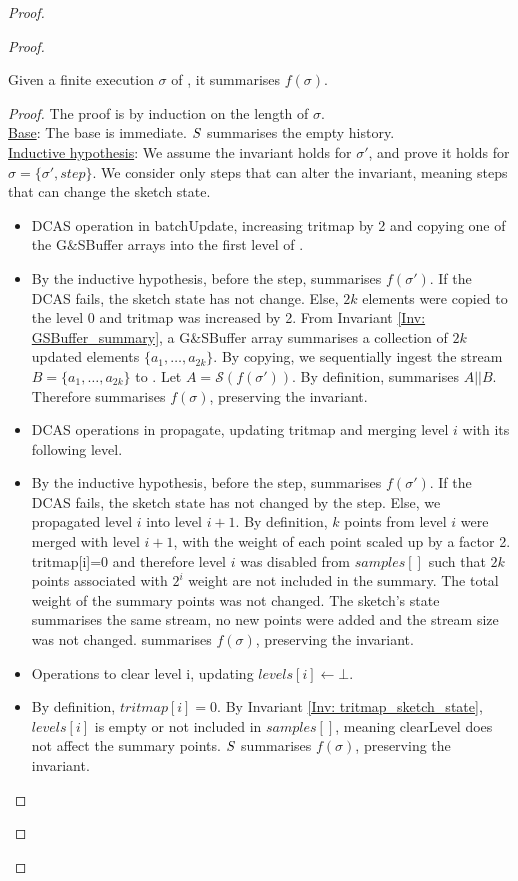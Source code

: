 \begin{proof}
\begin{proof}
\begin{invariant}\label{Inv: summary_history}
Given a finite execution $\sigma$ of \mysketch, it summarises \(f(\sigma)\).
\end{invariant}
\begin{proof}
The proof is by induction on the length of \(\sigma\).\\
\underline{Base}: The base is immediate. \(\mathnormal{S}\) summarises the empty history.\\
\underline{Inductive hypothesis}: We assume the invariant holds for \(\sigma'\), and prove it holds for \(\sigma = \{\sigma',step\}\). We consider only steps that can alter the invariant, meaning steps that can change the sketch state.
\begin{itemize}
    \item DCAS operation in batchUpdate, increasing tritmap by 2 and copying one of the G\&SBuffer arrays into the first level of \mysketch.
    \item[] By the inductive hypothesis, before the step, \mysketch summarises \(f(\sigma')\). If the DCAS fails, the sketch state has not change. Else, $2k$ elements were copied to the level 0 and tritmap was increased by 2. 
    From Invariant \ref{Inv: GSBuffer_summary}, a G\&SBuffer array summarises a collection of \(2k\) updated elements \(\{a_1,\dots,a_{2k}\}\). By copying, we sequentially ingest the stream \(B=\{a_1,\dots,a_{2k}\}\) to \mysketch. Let \(A=\mathcal{S}(f(\sigma'))\). By definition, \mysketch summarises \(A||B\). Therefore \mysketch summarises \(f(\sigma)\), preserving the invariant. 
    \item DCAS operations in propagate, updating tritmap and merging level \(i\) with its following level.
    \item[] By the inductive hypothesis, before the step, \mysketch summarises \(f(\sigma')\). If the DCAS fails, the sketch state has not changed by the step. Else, we propagated level \(i\) into level \(i+1\). By definition, \(k\) points from level \(i\) were merged with level \(i+1\), with the weight of each point scaled up by a factor 2. tritmap[i]=0 and therefore level \(i\) was disabled from \(samples[]\) such that \(2k\) points associated with \(2^i\) weight are not included in the summary. The total weight of the summary points was not changed. The sketch's state summarises the same stream, no new points were added and the stream size was not changed. \mysketch summarises \(f(\sigma)\), preserving the invariant. 
    \item Operations to clear level i, updating \(levels[i] \gets \bot\).
    \item[] By definition, \(tritmap[i] = 0\). By Invariant \ref{Inv: tritmap_sketch_state}, \(levels[i]\) is empty or not included in \(samples[]\), meaning clearLevel does not affect the summary points.  \(\mathnormal{S}\) summarises \(f(\sigma)\), preserving the invariant. 
\end{itemize}
\end{proof}


\end{proof}
\end{proof}
